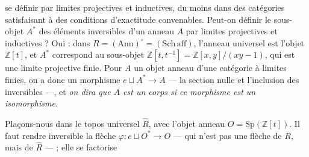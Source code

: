 \documentclass[11pt,a4paper]{article}
\begin{document}
se définir par limites projectives et inductives, du moins dans des
catégories satisfaisant à des conditions d'exactitude convenables. Peut-on
définir le sous-objet $A^{*}$ des éléments inversibles d'un anneau $A$ par
limites projectives et inductives ? Oui : dans $R = (\mathrm{Ann})^{\circ} =
(\mathrm{Sch\,aff})$, l'anneau universel est l'objet $\mathbb{Z}[t]$, et
$A^{*}$ correspond au sous-objet $\mathbb{Z}[t, t^{-1}] = \mathbb{Z}[x,y]/
(xy - 1)$, qui est une limite projective finie. Pour $A$ un objet anneau
d'une catégorie à limites finies, on a donc un morphisme $e \sqcup A^{*}
\to A$ — la section nulle et l'inclusion des inversibles —, et \emph{on
dira que $A$ est un corps si ce morphisme est un isomorphisme}.

Plaçons-nous dans le topos universel $\widehat{R}$, avec l'objet anneau $O
= \mathrm{Sp}(\mathbb{Z}[t])$. Il faut rendre inversible la flèche $\varphi
: e \sqcup O^{*} \to O$ — qui n'est pas une flèche de $R$, mais de
$\widehat{R}$ — ; elle se factorise

\end{document}
